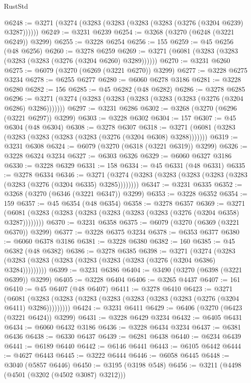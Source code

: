 \begin{lexlean}{RustStd}
\begin{coremodule}
@6248 := @3271 (@3274 (@3283 (@3283 (@3283 (@3283 (@3276 (@3204 @6239) @3287))))))
@6249 := @3231 @6239
@6254 := @3268 (@3270 (@6248 (@3221 @6249)) @3299)
@6255 := @3228 @6254
@6256 := 155
@6259 := @45 @6256 (@48 @6256)
@6260 := @3278 @6259
@6269 := @3271 (@6081 (@3283 (@3283 (@3283 (@3283 (@3276 (@3204 @6260) @3289))))))
@6270 := @3231 @6260
@6275 := @6079 (@3270 (@6269 (@3221 @6270)) @3299)
@6277 := @3228 @6275 @3234
@6278 := @6255 @6277
@6280 := @6060 @6278 @3186
@6281 := @3228 @6280
@6282 := 156
@6285 := @45 @6282 (@48 @6282)
@6286 := @3278 @6285
@6296 := @3271 (@3274 (@3283 (@3283 (@3283 (@3283 (@3283 (@3276 (@3204 @6286) @3286)))))))
@6297 := @3231 @6286
@6302 := @3268 (@3270 (@6296 (@3221 @6297)) @3299)
@6303 := @3228 @6302
@6304 := 157
@6307 := @45 @6304 (@48 @6304)
@6308 := @3278 @6307
@6318 := @3271 (@6081 (@3283 (@3283 (@3283 (@3283 (@3283 (@3276 (@3204 @6308) @3288)))))))
@6319 := @3231 @6308
@6324 := @6079 (@3270 (@6318 (@3221 @6319)) @3299)
@6326 := @3228 @6324 @3234
@6327 := @6303 @6326
@6329 := @6060 @6327 @3186
@6330 := @3228 @6329
@6331 := 158
@6334 := @45 @6331 (@48 @6331)
@6335 := @3278 @6334
@6346 := @3271 (@3274 (@3283 (@3283 (@3283 (@3283 (@3283 (@3283 (@3276 (@3204 @6335) @3285))))))))
@6347 := @3231 @6335
@6352 := @3268 (@3270 (@6346 (@3221 @6347)) @3299)
@6353 := @3228 @6352
@6354 := 159
@6357 := @45 @6354 (@48 @6354)
@6358 := @3278 @6357
@6369 := @3271 (@6081 (@3283 (@3283 (@3283 (@3283 (@3283 (@3283 (@3276 (@3204 @6358) @3287))))))))
@6370 := @3231 @6358
@6375 := @6079 (@3270 (@6369 (@3221 @6370)) @3299)
@6377 := @3228 @6375 @3234
@6378 := @6353 @6377
@6380 := @6060 @6378 @3186
@6381 := @3228 @6380
@6382 := 160
@6385 := @45 @6382 (@48 @6382)
@6386 := @3278 @6385
@6398 := @3271
    (@3274 (@3283 (@3283 (@3283 (@3283 (@3283 (@3283 (@3283 (@3276 (@3204 @6386) @3284)))))))))
@6399 := @3231 @6386
@6404 := @3490 (@3270 (@6398 (@3221 @6399)) @3299)
@6405 := @3228 @6404
@6406 := @3265 @4437
@6407 := 161
@6410 := @45 @6407 (@48 @6407)
@6411 := @3278 @6410
@6423 := @3271
    (@6081 (@3283 (@3283 (@3283 (@3283 (@3283 (@3283 (@3283 (@3276 (@3204 @6411) @3286)))))))))
@6424 := @3231 @6411
@6429 := @6406 (@3270 (@6423 (@3221 @6424)) @3299)
@6431 := @3228 @6429 @3234
@6432 := @6405 @6431
@6434 := @6060 @6432 @3186
@6436 := @3228 @6434 @3234
@6437 := @6381 @6436
@6438 := @6330 @6437
@6439 := @6281 @6438
@6440 := @6234 @6439
@6441 := @6189 @6440
@6442 := @6146 @6441
@6443 := @6105 @6442
@6444 := @4627 @6443
@6445 := @3222 @6444
@6446 := @6058 @6445
@6448 := @3040 (@5857 @6446)
@6450 := @3195 (@3198 @548)
@6456 := @3211 (@4498 (@4501 (@3202 (@4502 @3087) @3212)))

\end{coremodule}
\end{lexlean}
